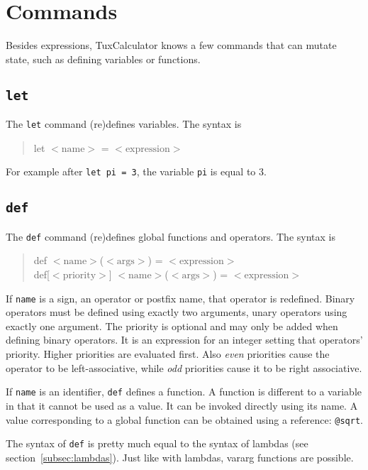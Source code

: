 \documentclass[10pt]{article}
\newcommand{\argument}[1]{{${\big<}\mathrm{#1}{\big>}$}}
\newenvironment{code}{\begin{quote}\ttfamily}{\end{quote}}
\begin{document}
    \section{Commands}\label{sec:commands}
    Besides expressions, TuxCalculator knows a few commands that can mutate state, such as defining variables or functions.
    
    \subsection{\texttt{let}}\label{subsec:cmd-let}
    The \verb|let| command {\small(re)}defines variables.
    The syntax is
    \begin{code}
        let \argument{name} = \argument{expression}
    \end{code}
    For example after \verb|let pi = 3|, the variable \verb|pi| is equal to $ 3 $.
    
    \subsection{\texttt{def}}\label{subsec:cmd-def}
    The \verb|def| command {\small(re)}defines global functions and operators.
    The syntax is
    \begin{code}
        def \argument{name}(\argument{args}) = \argument{expression} \\
        def[\argument{priority}] \argument{name}(\argument{args}) = \argument{expression}
    \end{code}
    If \verb|name| is a sign, an operator or postfix name, that operator is redefined.
    Binary operators must be defined using exactly two arguments, unary operators using exactly one argument.
    The priority is optional and may only be added when defining binary operators.
    It is an expression for an integer setting that operators' priority.
    Higher priorities are evaluated first.
    Also \textsl{even} priorities cause the operator to be left-associative, while \textsl{odd} priorities cause it to be right associative.
    
    If \verb|name| is an identifier, \verb|def| defines a function.
    A function is different to a variable in that it cannot be used as a value.
    It can be invoked directly using its name.
    A value corresponding to a global function can be obtained using a reference: \verb|@sqrt|.
    
    The syntax of \verb|def| is pretty much equal to the syntax of lambdas (see section~\ref{subsec:lambdas}).
    Just like with lambdas, vararg functions are possible.
    
\end{document}

